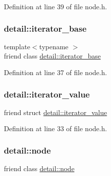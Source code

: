 Definition at line 39 of file node.\+h.

\mbox{\label{class_y_a_m_l_1_1_node_a95513f553864beda7d559428085c05f9}} 
\subsubsection{\texorpdfstring{detail::iterator\_base}{detail::iterator\_base}}
{\footnotesize\ttfamily template$<$typename $>$ \\
friend class \mbox{\hyperlink{class_y_a_m_l_1_1detail_1_1iterator__base}{detail\+::iterator\+\_\+base}}\hspace{0.3cm}{\ttfamily [friend]}}



Definition at line 37 of file node.\+h.

\mbox{\label{class_y_a_m_l_1_1_node_accc6b154ee40bff3b5acc6db8015a8c6}} 
\subsubsection{\texorpdfstring{detail::iterator\_value}{detail::iterator\_value}}
{\footnotesize\ttfamily friend struct \mbox{\hyperlink{struct_y_a_m_l_1_1detail_1_1iterator__value}{detail\+::iterator\+\_\+value}}\hspace{0.3cm}{\ttfamily [friend]}}



Definition at line 33 of file node.\+h.

\mbox{\label{class_y_a_m_l_1_1_node_abb1f10f2e479de89a0809c3e7f8fac9b}} 
\subsubsection{\texorpdfstring{detail::node}{detail::node}}
{\footnotesize\ttfamily friend class \mbox{\hyperlink{class_y_a_m_l_1_1detail_1_1node}{detail\+::node}}\hspace{0.3cm}{\ttfamily [friend]}}



